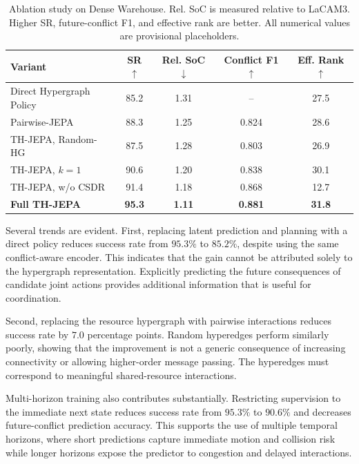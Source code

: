 \documentclass{article} %
\begin{document}
\begin{table}[t]
\centering
\caption{Ablation study on Dense Warehouse. Rel. SoC is measured relative to LaCAM3. Higher SR, future-conflict F1, and effective rank are better. All numerical values are provisional placeholders.}
\label{tab:ablation}
\small
\setlength{\tabcolsep}{4.0pt}
\begin{tabular}{lcccc}
\toprule
Variant
& SR $\uparrow$
& Rel. SoC $\downarrow$
& Conflict F1 $\uparrow$
& Eff. Rank $\uparrow$ \\
\midrule
Direct Hypergraph Policy
    & 85.2 & 1.31 & --    & 27.5 \\
Pairwise-JEPA
    & 88.3 & 1.25 & 0.824 & 28.6 \\
TH-JEPA, Random-HG
    & 87.5 & 1.28 & 0.803 & 26.9 \\
TH-JEPA, $k=1$
    & 90.6 & 1.20 & 0.838 & 30.1 \\
TH-JEPA, w/o CSDR
    & 91.4 & 1.18 & 0.868 & 12.7 \\
\midrule
\textbf{Full TH-JEPA}
    & \textbf{95.3}
    & \textbf{1.11}
    & \textbf{0.881}
    & \textbf{31.8} \\
\bottomrule
\end{tabular}
\end{table}

Several trends are evident. First, replacing latent prediction and planning with a direct policy reduces success rate from $95.3\%$ to $85.2\%$, despite using the same conflict-aware encoder. This indicates that the gain cannot be attributed solely to the hypergraph representation. Explicitly predicting the future consequences of candidate joint actions provides additional information that is useful for coordination.

Second, replacing the resource hypergraph with pairwise interactions reduces success rate by $7.0$ percentage points. Random hyperedges perform similarly poorly, showing that the improvement is not a generic consequence of increasing connectivity or allowing higher-order message passing. The hyperedges must correspond to meaningful shared-resource interactions.

Multi-horizon training also contributes substantially. Restricting supervision to the immediate next state reduces success rate from $95.3\%$ to $90.6\%$ and decreases future-conflict prediction accuracy. This supports the use of multiple temporal horizons, where short predictions capture immediate motion and collision risk while longer horizons expose the predictor to congestion and delayed interactions.
\end{document}
